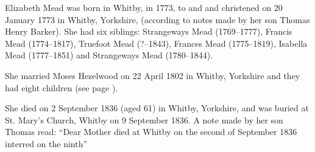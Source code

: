 
Elizabeth Mead was born in Whitby, in 1773, to  and  and christened on 20 January 1773 in Whitby, Yorkshire, (according to notes made by her son Thomas Henry Barker). She had six siblings: Strangeways Mead (1769--1777), Francis Mead (1774--1817), Truefoot Mead (?--1843), Frances Mead (1775--1819), Isabella Mead (1777--1851) and Strangeways Mead (1780--1844).

She married Moses Hezelwood on 22 April 1802 in	Whitby, Yorkshire \cite{MHezelwoodMarriage} and they had eight children (see page \pageref{Moses_Hezelwood}).

She died on 2 September 1836 (aged 61) in Whitby, Yorkshire, and was buried at St. Mary's Church, Whitby on 9 September 1836. \cite{EMeadDeath} A note made by her son Thomas read: ``Dear Mother died at Whitby on the second of September 1836 interred on the ninth''
